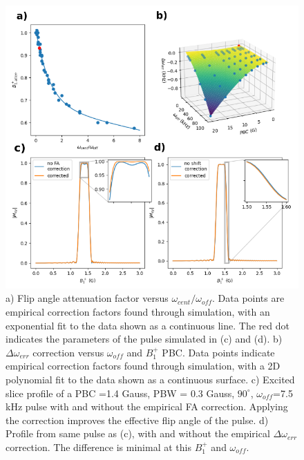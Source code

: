 \begin{figure}[h]
\centering
\includegraphics[width=1.\textwidth]{figures/correction_fact_processed.png}
\caption{a) Flip angle attenuation factor versus $ \omega_{cent}/\omega_{off}$.
Data points are empirical correction factors found through simulation, 
with an exponential fit to the data shown as a continuous line. 
The red dot indicates the parameters of the pulse simulated in (c) and (d). 
b) $\Delta \omega_{err}$ correction versus $\omega_{off}$ and $B_1^+$ PBC.  
Data points indicate empirical correction factors found through simulation, 
with a 2D polynomial fit to the data shown as a continuous surface. 
c) Excited slice profile of a PBC =1.4 Gauss, PBW = 0.3 Gauss, 
$90^\circ$, $\omega_{off}$=7.5 kHz pulse with and without the empirical FA correction. 
Applying the correction improves the effective flip angle of the pulse. 
d) Profile from same pulse as (c), 
with and without the empirical $\Delta \omega_{err}$ correction. 
The difference is minimal at this $B_1^+$ and $\omega_{off}$.
}
\label{fig:corrs}
\end{figure}

